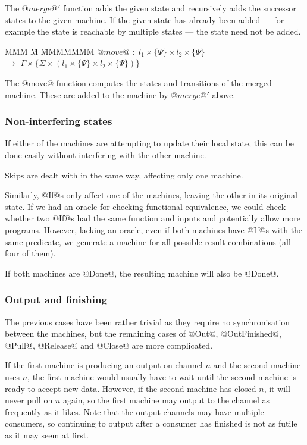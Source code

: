 The $@merge@'$ function adds the given state and recursively adds the successor states to the given machine.
If the given state has already been added --- for example the state is reachable by multiple states --- the state need not be added.

\begin{tabbing}
MMM \= M \= MMMMMMM\kill
$@move@$ \> $:$ \> $l_1 \times \{\Psi\} \times l_2 \times \{\Psi\}$ \\
           \> $\to$ \> $\Gamma \times \{\Sigma \times (l_1 \times \{\Psi\} \times l_2 \times \{\Psi\})\}$ \\
\end{tabbing}

The @move@ function computes the states and transitions of the merged machine.
These are added to the machine by $@merge@'$ above.




\subsubsection{Non-interfering states}
If either of the machines are attempting to update their local state, this can be done easily without interfering with the other machine.

Skips are dealt with in the same way, affecting only one machine.

Similarly, @If@s only affect one of the machines, leaving the other in its original state.
If we had an oracle for checking functional equivalence, we could check whether two @If@s had the same function and inputs and potentially allow more programs.
However, lacking an oracle, even if both machines have @If@s with the same predicate, we generate a machine for all possible result combinations (all four of them).

If both machines are @Done@, the resulting machine will also be @Done@.

\subsubsection{Output and finishing}
The previous cases have been rather trivial as they require no synchronisation between the machines, but the remaining cases of @Out@, @OutFinished@, @Pull@, @Release@ and @Close@ are more complicated.

If the first machine is producing an output on channel $n$ and the second machine uses $n$, the first machine would usually have to wait until the second machine is ready to accept new data.
However, if the second machine has closed $n$, it will never pull on $n$ again, so the first machine may output to the channel as frequently as it likes.
Note that the output channels may have multiple consumers, so continuing to output after a consumer has finished is not as futile as it may seem at first.

